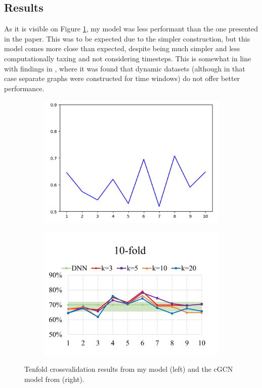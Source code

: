 	\subsection{Results}
	
	As it is visible on Figure \ref{fig:onlab_results}, my model was less performant than the one presented in the paper. This was to be expected due to the simpler construction, but this model comes more close than expected, despite being much simpler and less computationally taxing and not considering timesteps. This is somewhat in line with findings in \cite{said2023neurograph}, where it was found that dynamic datasets (although in that case separate graphs were constructed for time windows) do not offer better performance.
	
	\begin{figure}[!h]
		\centering
		\begin{subfigure}[b]{0.45\textwidth}
			\centering
			\includegraphics[width=\textwidth]{figures/onlab_results.png}
		\end{subfigure}
		\hfill
		\begin{subfigure}[b]{0.45\textwidth}
			\centering
			\includegraphics[width=\textwidth]{figures/paper_results.png}
		\end{subfigure}
		\caption{Tenfold crossvalidation results from my model (left) and the cGCN model from \cite{wang2021graph} (right).}
		\label{fig:onlab_results}
	\end{figure}

